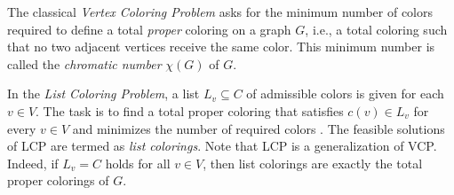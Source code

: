 \documentclass[preprint, 11pt, authoryear]{elsarticle}
\newcommand{\cn}[1]{\chi(#1)}
\begin{document}
The classical \emph{Vertex Coloring Problem} asks for the minimum number of colors required to define a total \emph{proper} coloring on a graph $G$, i.e., a total coloring such that no two adjacent vertices receive the same color. This minimum number is called the \emph{chromatic number} $\cn{G}$ of $G$. 




In the \emph{List Coloring Problem}, a list $L_v \subseteq C$ of admissible colors is given for each $v \in V$. The task is to find a total proper coloring that satisfies $c(v) \in L_v$ for every $v \in V$ and minimizes the number of required colors \citep{Lucci2024}.
The feasible solutions of LCP are termed as \emph{list colorings}. Note that LCP is a generalization of VCP. 
Indeed, if $L_v = C$ holds for all $v \in V$, then list colorings are exactly the total proper colorings of $G$. 
\end{document}

